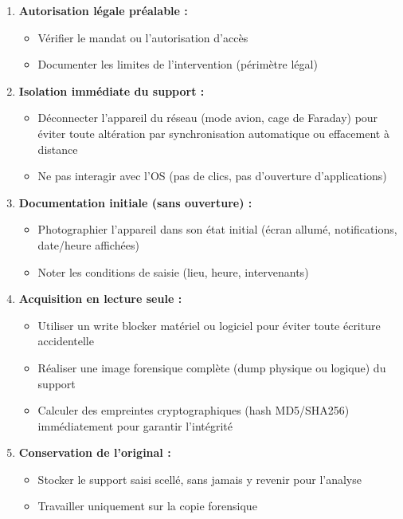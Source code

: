 \documentclass[12pt]{article}
\begin{document}
\begin{enumerate}
\item \textbf{Autorisation légale préalable :}
  \begin{itemize}
  \item Vérifier le mandat ou l'autorisation d'accès
  \item Documenter les limites de l'intervention (périmètre légal)
  \end{itemize}

\item \textbf{Isolation immédiate du support :}
  \begin{itemize}
  \item Déconnecter l'appareil du réseau (mode avion, cage de Faraday) pour éviter toute altération par synchronisation automatique ou effacement à distance
  \item Ne pas interagir avec l'OS (pas de clics, pas d'ouverture d'applications)
  \end{itemize}

\item \textbf{Documentation initiale (sans ouverture) :}
  \begin{itemize}
  \item Photographier l'appareil dans son état initial (écran allumé, notifications, date/heure affichées)
  \item Noter les conditions de saisie (lieu, heure, intervenants)
  \end{itemize}

\item \textbf{Acquisition en lecture seule :}
  \begin{itemize}
  \item Utiliser un write blocker matériel ou logiciel pour éviter toute écriture accidentelle
  \item Réaliser une image forensique complète (dump physique ou logique) du support
  \item Calculer des empreintes cryptographiques (hash MD5/SHA256) immédiatement pour garantir l'intégrité
  \end{itemize}

\item \textbf{Conservation de l'original :}
  \begin{itemize}
  \item Stocker le support saisi scellé, sans jamais y revenir pour l'analyse
  \item Travailler uniquement sur la copie forensique
  \end{itemize}


\end{enumerate}
\end{document}
